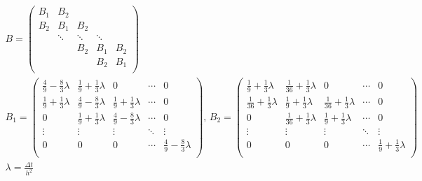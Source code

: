 \documentclass[UTF8]{article}
\begin{document}
\begin{gather*}
        B =
        \begin{pmatrix}
            B_1 & B_2    &        &        &     \\
            B_2 & B_1    & B_2    &        &     \\
            & \ddots & \ddots & \ddots &     \\
            &        & B_2    & B_1    & B_2 \\
            &        &        & B_2    & B_1 \\
        \end{pmatrix}\\
        B_1 =
        \begin{pmatrix}
            \frac{4}{9}-\frac{8}{3}\lambda & \frac{1}{9}+\frac{1}{3}\lambda & 0                              & \cdots & 0                              \\
            \frac{1}{9}+\frac{1}{3}\lambda & \frac{4}{9}-\frac{8}{3}\lambda & \frac{1}{9}+\frac{1}{3}\lambda & \cdots & 0                              \\
            0                              & \frac{1}{9}+\frac{1}{3}\lambda & \frac{4}{9}-\frac{8}{3}\lambda & \cdots & 0                              \\
            \vdots                         & \vdots                         & \vdots                         & \ddots & \vdots                         \\
            0                              & 0                              & 0                              & \cdots & \frac{4}{9}-\frac{8}{3}\lambda \\
        \end{pmatrix},\,
        B_2 =
        \begin{pmatrix}
            \frac{1}{9}+\frac{1}{3}\lambda  & \frac{1}{36}+\frac{1}{3}\lambda & 0                               & \cdots & 0                              \\
            \frac{1}{36}+\frac{1}{3}\lambda & \frac{1}{9}+\frac{1}{3}\lambda  & \frac{1}{36}+\frac{1}{3}\lambda & \cdots & 0           \\
            0                               & \frac{1}{36}+\frac{1}{3}\lambda & \frac{1}{9}+\frac{1}{3}\lambda  & \cdots & 0                              \\
            \vdots                          & \vdots                          & \vdots                          & \ddots & \vdots                         \\
            0                               & 0                               & 0                               & \cdots & \frac{1}{9}+\frac{1}{3}\lambda \\
        \end{pmatrix}\\
        \lambda = \frac{\Delta t}{h^2}
    \end{gather*}
\end{document}
